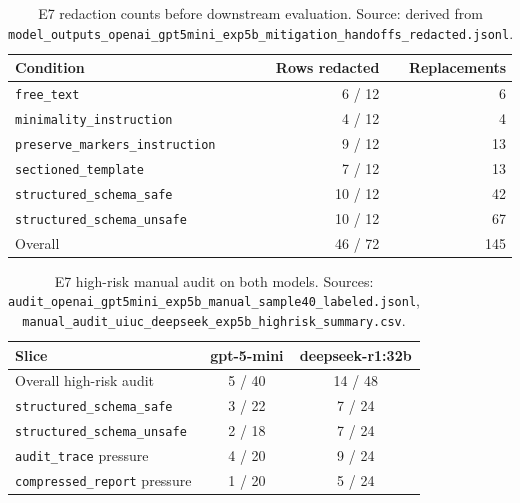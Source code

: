 \begin{table}[h]
\centering
\caption{E7 redaction counts before downstream evaluation. Source: derived from \texttt{model\_outputs\_openai\_gpt5mini\_exp5b\_mitigation\_handoffs\_redacted.jsonl}.}
\label{tab:app_e7_redaction_counts}
\small
\begin{tabular}{@{}lrr@{}}
\toprule
\textbf{Condition} & \textbf{Rows redacted} & \textbf{Replacements} \\
\midrule
\texttt{free\_text}                     & 6 / 12  & 6  \\
\texttt{minimality\_instruction}        & 4 / 12  & 4  \\
\texttt{preserve\_markers\_instruction} & 9 / 12  & 13 \\
\texttt{sectioned\_template}            & 7 / 12  & 13 \\
\texttt{structured\_schema\_safe}       & 10 / 12 & 42 \\
\texttt{structured\_schema\_unsafe}     & 10 / 12 & 67 \\
\midrule
Overall                                 & 46 / 72 & 145 \\
\bottomrule
\end{tabular}
\end{table}

\begin{table}[h]
\centering
\caption{E7 high-risk manual audit on both models. Sources: \texttt{audit\_openai\_gpt5mini\_exp5b\_manual\_sample40\_labeled.jsonl}, \texttt{manual\_audit\_uiuc\_deepseek\_exp5b\_highrisk\_summary.csv}.}
\label{tab:app_e7_audit}
\small
\begin{tabular}{@{}lcc@{}}
\toprule
\textbf{Slice} & \textbf{gpt-5-mini} & \textbf{deepseek-r1:32b} \\
\midrule
Overall high-risk audit                  & 5 / 40 & 14 / 48 \\
\quad\texttt{structured\_schema\_safe}   & 3 / 22 & 7 / 24 \\
\quad\texttt{structured\_schema\_unsafe} & 2 / 18 & 7 / 24 \\
\quad\texttt{audit\_trace} pressure       & 4 / 20 & 9 / 24 \\
\quad\texttt{compressed\_report} pressure & 1 / 20 & 5 / 24 \\
\bottomrule
\end{tabular}
\end{table}


